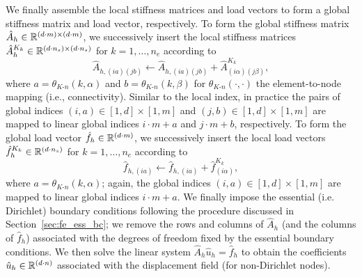 We finally assemble the local stiffness matrices and load vectors to form a global stiffness matrix and load vector, respectively.  To form the global stiffness matrix $\hat A_h \in \mathbb{R}^{(d\cdot m) \times (d \cdot m)}$, we successively insert the local stiffness matrices $\hat A^{K_k}_h \in \mathbb{R}^{(d \cdot n_s) \times (d \cdot n_s)}$ for $k = 1,\dots,n_e$ according to
\begin{equation*}
  \hat A_{h,(ia)(jb)} \leftarrow \hat A_{h,(ia)(jb)} + \hat A^{K_k}_{(i\alpha)(j\beta)}, 
\end{equation*}
where $a = \theta_{K\text{-}n}(k,\alpha)$ and $b = \theta_{K\text{-}n}(k,\beta)$ for $\theta_{K\text{-}n}(\cdot,\cdot)$ the element-to-node mapping (i.e., connectivity).  Similar to the local index, in practice the pairs of global indices $(i,a) \in [1,d] \times [1,m]$ and $(j,b) \in [1,d] \times [1,m]$ are mapped to linear global indices $i \cdot m + a$ and $j \cdot m + b$, respectively.  To form the global load vector $\hat f_h \in \mathbb{R}^{(d\cdot m)}$, we successively insert the local load vectors $\hat f^{K_k}_h \in \mathbb{R}^{(d \cdot n_s)}$ for $k = 1,\dots,n_e$ according to
\begin{equation*}
  \hat f_{h,(ia)} \leftarrow \hat f_{h,(ia)} + \hat f^{K_k}_{(i\alpha)}, 
\end{equation*}
where $a = \theta_{K\text{-}n}(k,\alpha)$; again, the global indices $(i,a) \in [1,d] \times [1,m]$ are mapped to linear global indices $i \cdot m + a$. We finally impose the essential (i.e. Dirichlet) boundary conditions following the procedure discussed in Section~\ref{sec:fe_ess_bc}; we remove the rows and columns of $\hat A_h$ (and the columns of $\hat f_h$) associated with the degrees of freedom fixed by the essential boundary conditions. We then solve the linear system $\hat A_h \hat u_h = \hat f_h$ to obtain the coefficients $\hat u_h \in \mathbb{R}^{(d\cdot n)}$ associated with the displacement field (for non-Dirichlet nodes). 

